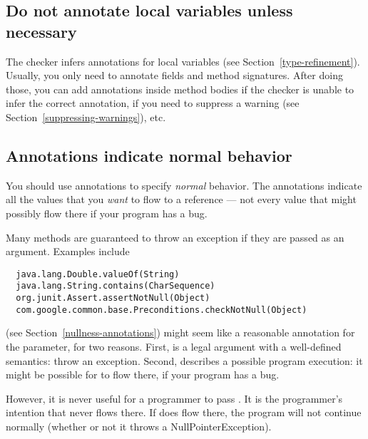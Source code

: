 \subsection{Do not annotate local variables unless necessary\label{tips-local-inference}}

The checker infers annotations for local variables (see
Section~\ref{type-refinement}).  Usually, you only need to annotate fields
and method signatures.  After doing those, you can add annotations inside
method bodies if the checker is unable to infer the correct annotation, if
you need to suppress a warning (see Section~\ref{suppressing-warnings}),
etc.


\subsection{Annotations indicate normal behavior\label{annotate-normal-behavior}}

You should use annotations to specify \emph{normal} behavior.  The
annotations indicate all the values that you \emph{want} to flow to a
reference --- not every value that might possibly flow there if your
program has a bug.

Many methods are guaranteed to throw an exception if they are passed 
as an argument.  Examples include

\begin{Verbatim}
  java.lang.Double.valueOf(String)
  java.lang.String.contains(CharSequence)
  org.junit.Assert.assertNotNull(Object)
  com.google.common.base.Preconditions.checkNotNull(Object)
\end{Verbatim}

 (see Section~\ref{nullness-annotations})
might seem like a reasonable annotation for the parameter,
for two reasons.  First,  is a legal argument with a
well-defined semantics:  throw an exception.  Second, 
describes a possible program execution:  it might be possible for
 to flow there, if your program has a bug.


However, it is never useful for a programmer to pass .  It is
the programmer's intention that  never flows there.  If
 does flow there, the program will not continue normally
(whether or not it throws a NullPointerException).

